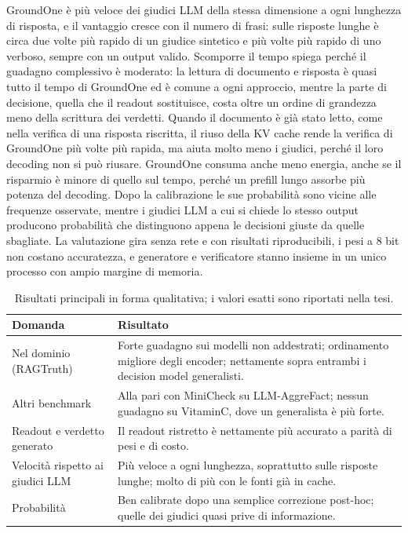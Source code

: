 \documentclass[11pt,a4paper]{article}
\begin{document}
GroundOne è più veloce dei giudici LLM della stessa dimensione a ogni lunghezza di risposta, e il vantaggio cresce con il
numero di frasi: sulle risposte lunghe è circa due volte più rapido di un giudice sintetico e più volte più rapido di uno
verboso, sempre con un output valido. Scomporre il tempo spiega perché il guadagno complessivo è moderato: la lettura di
documento e risposta è quasi tutto il tempo di GroundOne ed è comune a ogni approccio, mentre la parte di decisione, quella
che il readout sostituisce, costa oltre un ordine di grandezza meno della scrittura dei verdetti. Quando il documento è
già stato letto, come nella verifica di una risposta riscritta, il riuso della KV cache rende la verifica di GroundOne più
volte più rapida, ma aiuta molto meno i giudici, perché il loro decoding non si può riusare. GroundOne consuma anche meno
energia, anche se il risparmio è minore di quello sul tempo, perché un prefill lungo assorbe più potenza del decoding. Dopo
la calibrazione le sue probabilità sono vicine alle frequenze osservate, mentre i giudici LLM a cui si chiede lo stesso
output producono probabilità che distinguono appena le decisioni giuste da quelle sbagliate. La valutazione gira senza
rete e con risultati riproducibili, i pesi a 8 bit non costano accuratezza, e generatore e verificatore stanno insieme in
un unico processo con ampio margine di memoria.

\begin{table}[h]
\centering
\small
\begin{tabular}{>{\raggedright\arraybackslash}p{6.6cm}>{\raggedright\arraybackslash}p{8.4cm}}
\toprule
Domanda & Risultato \\
\midrule
Nel dominio (RAGTruth) & Forte guadagno sui modelli non addestrati; ordinamento migliore degli encoder; nettamente sopra entrambi i decision model generalisti. \\
Altri benchmark & Alla pari con MiniCheck su LLM-AggreFact; nessun guadagno su VitaminC, dove un generalista è più forte. \\
Readout e verdetto generato & Il readout ristretto è nettamente più accurato a parità di pesi e di costo. \\
Velocità rispetto ai giudici LLM & Più veloce a ogni lunghezza, soprattutto sulle risposte lunghe; molto di più con le fonti già in cache. \\
Probabilità & Ben calibrate dopo una semplice correzione post-hoc; quelle dei giudici quasi prive di informazione. \\
\bottomrule
\end{tabular}
\caption{Risultati principali in forma qualitativa; i valori esatti sono riportati nella tesi.}
\label{tab:results}
\end{table}
\end{document}
